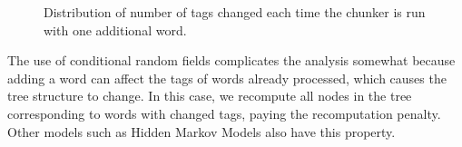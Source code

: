 \documentclass[conference]{IEEEtran}
\numberwithin{equation}{section}
\begin{document}
\begin{figure}[h!]
  \centering   
  \label{fig:crf_retagging_hist}

\caption{Distribution of number of tags changed each time the chunker is run with one additional word.}
\end{figure}

The use of conditional random fields complicates the analysis somewhat because adding a word can affect the tags of words already processed, which causes the tree structure to change. In this case, we recompute all nodes in the tree corresponding to words with changed tags, paying the recomputation penalty. Other models such as Hidden Markov Models also have this property.
\end{document}
